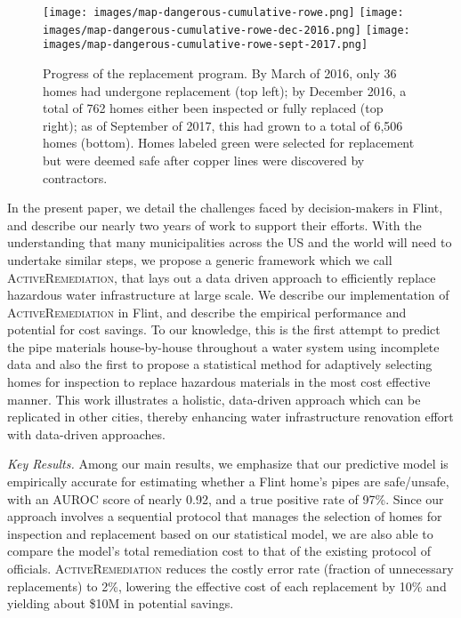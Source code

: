 \documentclass[sigconf]{acmart}
\def\activerem{\textsc{ActiveRemediation}\xspace}
\begin{document}
\begin{figure}[!ht]
\begin{center}
\texttt{[image: images/map-dangerous-cumulative-rowe.png]}
\texttt{[image: images/map-dangerous-cumulative-rowe-dec-2016.png]}
\texttt{[image: images/map-dangerous-cumulative-rowe-sept-2017.png]}
\caption{
  Progress of the replacement program. By March of 2016, only 36 homes had undergone replacement (top left); by December 2016, a total of 762 homes either been inspected or fully replaced (top right); as of September of 2017, this had grown to a total of 6,506 homes (bottom). Homes labeled green were selected for replacement but were deemed safe after copper lines were discovered by contractors.} \label{fig:maps_by_time}
\end{center}
\end{figure}

In the present paper, we detail the challenges faced by decision-makers in Flint, and describe our nearly two years of work to support their efforts. With the understanding that many municipalities across the US and the world will need to undertake similar steps, we propose a generic framework which we call \activerem, that lays out a data driven approach to efficiently replace hazardous water infrastructure at large scale. We describe our implementation of \activerem in Flint, and describe the empirical performance and potential for cost savings. To our knowledge, this is the first attempt to predict the pipe materials house-by-house throughout a water system using incomplete data and also the first to propose a statistical method for adaptively selecting homes for inspection to replace hazardous materials in the most cost effective manner. This work illustrates a holistic, data-driven approach which can be replicated in other cities, thereby enhancing water infrastructure renovation effort with data-driven approaches.

\emph{Key Results.} Among our main results, we emphasize that our predictive model is empirically accurate for estimating whether a Flint home's pipes are safe/unsafe, with an AUROC score of nearly 0.92, and a true positive rate of 97\%. Since our approach involves a sequential protocol that manages the selection of homes for inspection and replacement based on our statistical model, we are also able to compare the model's total remediation cost to that of the existing protocol of officials. \activerem reduces the costly error rate (fraction of unnecessary replacements) to 2\%, lowering the effective cost of each replacement by 10\% and yielding about \$10M in potential savings.
\end{document}
